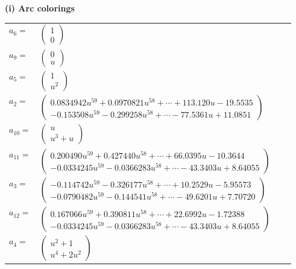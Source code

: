 \documentclass[1p]{elsarticle_modified}
\theoremstyle{definition}
\begin{document}
\flushleft \textbf{(i) Arc colorings}\\
\begin{tabular}{m{7pt} m{180pt} m{7pt} m{180pt} }
\flushright $a_{6}=$&$\begin{pmatrix}1\\0\end{pmatrix}$ \\
\flushright $a_{9}=$&$\begin{pmatrix}0\\u\end{pmatrix}$ \\
\flushright $a_{5}=$&$\begin{pmatrix}1\\u^2\end{pmatrix}$ \\
\flushright $a_{2}=$&$\begin{pmatrix}0.0834942 u^{59}+0.0970821 u^{58}+\cdots+113.120 u-19.5535\\-0.153508 u^{59}-0.299258 u^{58}+\cdots-77.5361 u+11.0851\end{pmatrix}$ \\
\flushright $a_{10}=$&$\begin{pmatrix}u\\u^3+u\end{pmatrix}$ \\
\flushright $a_{11}=$&$\begin{pmatrix}0.200490 u^{59}+0.427440 u^{58}+\cdots+66.0395 u-10.3644\\-0.0334245 u^{59}-0.0366283 u^{58}+\cdots-43.3403 u+8.64055\end{pmatrix}$ \\
\flushright $a_{3}=$&$\begin{pmatrix}-0.114742 u^{59}-0.326177 u^{58}+\cdots+10.2529 u-5.95573\\-0.0790482 u^{59}-0.144541 u^{58}+\cdots-49.6201 u+7.70720\end{pmatrix}$ \\
\flushright $a_{12}=$&$\begin{pmatrix}0.167066 u^{59}+0.390811 u^{58}+\cdots+22.6992 u-1.72388\\-0.0334245 u^{59}-0.0366283 u^{58}+\cdots-43.3403 u+8.64055\end{pmatrix}$ \\
\flushright $a_{4}=$&$\begin{pmatrix}u^2+1\\u^4+2 u^2\end{pmatrix}$ \\

\end{tabular}
\end{document}
